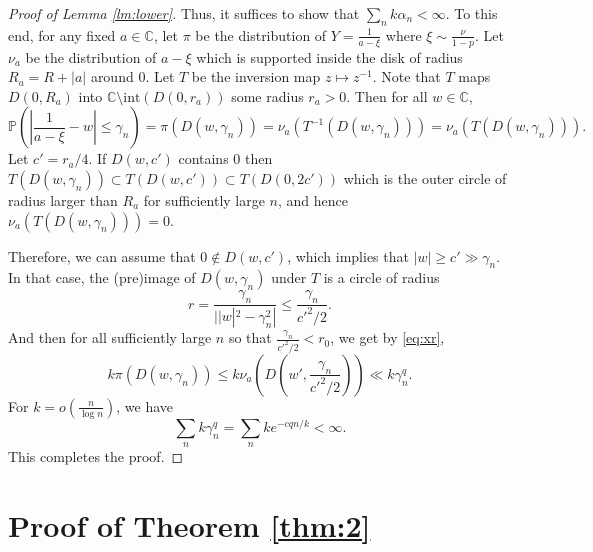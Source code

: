\documentclass[12pt, reqno]{amsart}
\theoremstyle{plain}
\theoremstyle{definition}
\newcommand\C{{\mathbb{C}}}
\renewcommand\P{{\mathbb{P}}}
\begin{document}
\begin{proof}[Proof of Lemma \ref{lm:lower}]
 	 
 	 Thus, it suffices to show that $\sum_{n} k \alpha_n <\infty$. To this end, for any fixed $a\in \C$, let $\pi$ be the distribution of $Y = \frac{1}{a - \xi}$ where $\xi\sim \frac{\nu}{1-p}$. Let $\nu_a$ be the distribution of $a - \xi$ which is supported inside the disk of radius $R_a  = R + |a|$ around 0. Let $T$ be the inversion map $z\mapsto z^{-1}$. Note that $T$ maps $D(0, R_a)$ into $\C\setminus \text{int}(D (0, r_a))$ some radius $r_a>0$. Then for all $w\in \C$, 
 	 $$\P\left (\left |\frac{1}{a - \xi}-w\right  |\le  \gamma_n\right )=\pi(D(w, \gamma_n)) = \nu_a(T^{-1}(D(w, \gamma_n)))=\nu_a(T(D(w, \gamma_n))).$$
 	 Let $c' = r_a/4$. If $D(w, c')$ contains $0$ then $T(D(w, \gamma_n))\subset T(D(w, c'))\subset T(D(0, 2c'))$ which is the outer circle of radius larger than $R_a$ for sufficiently large $n$, and hence  $\nu_a(T(D(w, \gamma_n)))=0$. 
 	 
 	 Therefore, we can assume that $0\notin D(w, c')$, which implies that $|w|\ge c'\gg \gamma_n$. In that case, the (pre)image of $D(w, \gamma_n)$ under $T$ is a circle of radius
 	 $$r = \frac{\gamma_n}{||w|^2 - \gamma_n^2|}\le \frac{ \gamma_n}{c'^2/2}.$$
 	 And then for all sufficiently large $n$ so that $\frac{ \gamma_n}{c'^2/2}<r_0$, we get by \eqref{eq:xr},
 	 $$k\pi(D(w, \gamma_n)) \le k\nu_a(D(w', \frac{ \gamma_n}{c'^2/2}))\ll k \gamma_n^{q}.$$
 	 For $k = o(\frac{n}{\log n})$, we have
 	 $$\sum_{n} k \gamma_n^{q} = \sum_{n} k e^{-cqn/k}<\infty.$$
 	 This completes the proof.
 \end{proof}


 

 
 \section{Proof of Theorem \ref{thm:2}}
\end{document}
